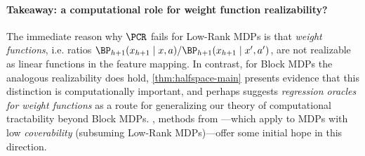 \paragraph{Takeaway: a computational role for weight function realizability?} The immediate reason why $\PCR$ fails for Low-Rank MDPs is that \emph{weight functions}, i.e. ratios $\BP_{h+1}(x_{h+1}\mid{}x,a) / \BP_{h+1}(x_{h+1}\mid{}x',a')$, are not realizable as linear functions in the feature mapping. In contrast, for Block MDPs the analogous realizability does hold,  \cref{thm:halfspace-main} presents evidence that this distinction is computationally important, and perhaps suggests \emph{regression oracles for weight functions} as a route for generalizing our theory of computational tractability beyond Block MDPs. , methods from \citet{amortila2024scalable}---which apply to MDPs with low \emph{coverability} (subsuming Low-Rank MDPs)---offer some initial hope in this direction.\loose


